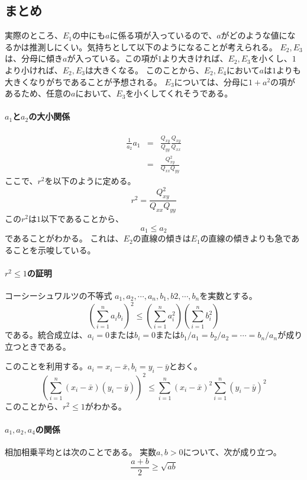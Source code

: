 \subsection{まとめ}
実際のところ、$E_1$の中にも$a$に係る項が入っているので、$a$がどのような値になるかは推測しにくい。気持ちとして以下のようになることが考えられる。
$E_2,E_3$は、分母に傾き$a$が入っている。この項が$1$より大きければ、$E_2,E_3$を小くし、$1$より小ければ、$E_2,E_3$は大きくなる。
このことから、$E_2,E_4$において$a$は$1$よりも大きくなりがちであることが予想される。
$E_3$については、分母に$1+a^2$の項があるため、任意の$a$において、$E_3$を小くしてくれそうである。

\paragraph{$a_1$と$a_2$の大小関係}
\begin{eqnarray*}
 \frac{1}{a_2}a_1 &=& \frac{Q_{xy}}{Q_{yy}}\frac{Q_{xy}}{Q_{xx}} \\
 &=& \frac{Q^2_{xy}}{Q_{xx}Q_{yy}}
\end{eqnarray*}
ここで、$r^2$を以下のように定める。
\begin{equation*}
 r^2 = \frac{Q^2_{xy}}{Q_{xx}Q_{yy}}
\end{equation*}
この$r^2$は$1$以下であることから、
\begin{equation*}
 a_1 \leq a_2
\end{equation*}
であることがわかる。
これは、$E_2$の直線の傾きは$E_1$の直線の傾きよりも急であることを示唆している。

\paragraph{$r^2\leq 1$の証明}
コーシーシュワルツの不等式
$a_1,a_2,\cdots,a_n,b_1,b2,\cdots,b_n$を実数とする。
\begin{equation*}
 (\sum_{i=1}^n a_i b_i)^2 \leq (\sum_{i=1}^n a_i^2)(\sum_{i=1}^n b_i^2)
\end{equation*}
である。統合成立は、$a_i=0$または$b_i=0$または$b_1/a_1=b_2/a_2=\cdots=b_n/a_n$が成り立つときである。

このことを利用する。$a_i=x_i-\bar{x},b_i=y_i-\bar{y}$とおく。
\begin{equation*}
 \left(\sum_{i=1}^n (x_i-\bar{x})(y_i-\bar{y})\right)^2 \leq  \sum_{i=1}^n(x_i-\bar{x})^2\sum_{i=1}^n(y_i-\bar{y})^2
\end{equation*}
このことから、$r^2\leq 1$がわかる。

\paragraph{$a_1,a_2,a_4$の関係}
相加相乗平均とは次のことである。
実数$a,b>0$について、次が成り立つ。
\begin{equation*}
 \frac{a+b}{2} \geq \sqrt{ab}
\end{equation*}

